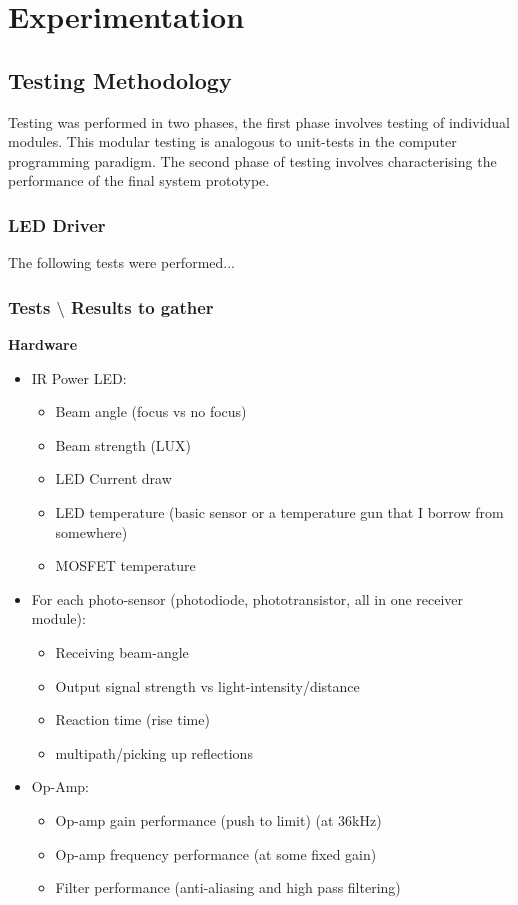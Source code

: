 \chapter{Experimentation}
\label{ch_experimentation}

\section{Testing Methodology}

Testing was performed in two phases, the first phase involves testing of individual modules. This modular testing is analogous to unit-tests in the computer programming paradigm. The second phase of testing involves characterising the performance of the final system prototype.

\subsection{LED Driver}
The following tests were performed...


\subsection{Tests $\setminus$ Results to gather}
\textbf{Hardware}
\begin{itemize}
	\item IR Power LED:
	\begin{itemize}
		\item Beam angle (focus vs no focus)
		\item Beam strength (LUX)
		\item LED Current draw
		\item LED temperature (basic sensor or a temperature gun that I borrow from somewhere)
		\item MOSFET temperature
	\end{itemize}
	\item For each photo-sensor (photodiode, phototransistor, all in one receiver module):
	\begin{itemize}
		\item Receiving beam-angle
		\item Output signal strength vs light-intensity/distance
		\item Reaction time (rise time)
		\item multipath/picking up reflections
	\end{itemize}
	\item Op-Amp:
	\begin{itemize}
		\item Op-amp gain performance (push to limit) (at 36kHz)
		\item Op-amp frequency performance (at some fixed gain)
		\item Filter performance (anti-aliasing and high pass filtering)
	\end{itemize}
\end{itemize}

